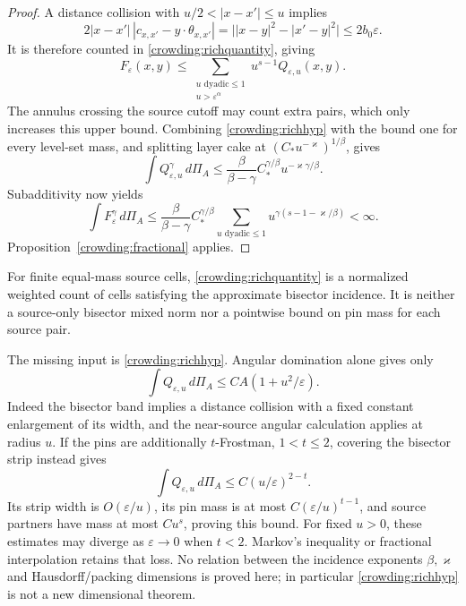 \begin{proof}
A distance collision with \(u/2<|x-x'|\le u\) implies
\[
 2|x-x'|\,|c_{x,x'}-y\cdot\theta_{x,x'}|
 =\big||x-y|^2-|x'-y|^2\big|\le2b_0\varepsilon.
\]
It is therefore counted in \eqref{crowding:richquantity}, giving
\[
 F_\varepsilon(x,y)
 \le\sum_{\substack{u\text{ dyadic}\le1\\u>\varepsilon^\alpha}}
           u^{s-1}Q_{\varepsilon,u}(x,y).
\]
The annulus crossing the source cutoff may count extra pairs, which
only increases this upper bound. Combining \eqref{crowding:richhyp}
with the bound one for every level-set mass, and splitting layer cake
at \((C_*u^{-\varkappa})^{1/\beta}\), gives
\[
 \int Q_{\varepsilon,u}^\gamma\,d\Pi_A
 \le\frac\beta{\beta-\gamma}
       C_*^{\gamma/\beta}u^{-\varkappa\gamma/\beta}.
\]
Subadditivity now yields
\[
 \int F_\varepsilon^\gamma\,d\Pi_A
 \le\frac\beta{\beta-\gamma}C_*^{\gamma/\beta}
       \sum_{u\text{ dyadic}\le1}
         u^{\gamma(s-1-\varkappa/\beta)}<\infty.
\]
Proposition~\ref{crowding:fractional} applies.
\end{proof}

For finite equal-mass source cells, \eqref{crowding:richquantity} is
a normalized weighted count of cells satisfying the approximate
bisector incidence. It is neither a source-only bisector mixed norm
nor a pointwise bound on pin mass for each source pair.

The missing input is \eqref{crowding:richhyp}. Angular domination alone
gives only
\[
 \int Q_{\varepsilon,u}\,d\Pi_A
 \le CA(1+u^2/\varepsilon).
\]
Indeed the bisector band implies a distance collision with a fixed
constant enlargement of its width, and the near-source angular
calculation applies at radius \(u\). If the pins are additionally
\(t\)-Frostman, \(1<t\le2\), covering the bisector strip instead gives
\[
 \int Q_{\varepsilon,u}\,d\Pi_A
 \le C(u/\varepsilon)^{2-t}.
\]
Its strip width is \(O(\varepsilon/u)\), its pin mass is at most
\(C(\varepsilon/u)^{t-1}\), and source partners have mass at most
\(Cu^s\), proving this bound. For fixed \(u>0\), these estimates
may diverge as \(\varepsilon\to0\) when \(t<2\).
Markov's inequality or fractional interpolation retains that loss.
No relation between the incidence exponents
\(\beta,\varkappa\) and Hausdorff/packing dimensions is proved here;
in particular \eqref{crowding:richhyp} is not a new dimensional theorem.

